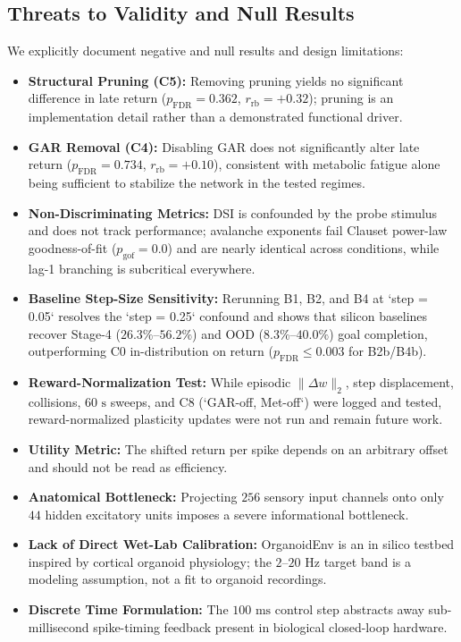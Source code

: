 \documentclass[journal]{IEEEtran}
\begin{document}
\subsection{Threats to Validity and Null Results}
We explicitly document negative and null results and design limitations:
\begin{itemize}
    \item \textbf{Structural Pruning (C5):} Removing pruning yields no significant difference in late return ($p_{\mathrm{FDR}} = 0.362$, $r_{\mathrm{rb}} = +0.32$); pruning is an implementation detail rather than a demonstrated functional driver.
    \item \textbf{GAR Removal (C4):} Disabling GAR does not significantly alter late return ($p_{\mathrm{FDR}} = 0.734$, $r_{\mathrm{rb}} = +0.10$), consistent with metabolic fatigue alone being sufficient to stabilize the network in the tested regimes.
    \item \textbf{Non-Discriminating Metrics:} DSI is confounded by the probe stimulus and does not track performance; avalanche exponents fail Clauset power-law goodness-of-fit ($p_{\mathrm{gof}} = 0.0$) and are nearly identical across conditions, while lag-1 branching is subcritical everywhere.
    \item \textbf{Baseline Step-Size Sensitivity:} Rerunning B1, B2, and B4 at `step = 0.05` resolves the `step = 0.25` confound and shows that silicon baselines recover Stage-4 ($26.3\%\text{--}56.2\%$) and OOD ($8.3\%\text{--}40.0\%$) goal completion, outperforming C0 in-distribution on return ($p_{\mathrm{FDR}} \le 0.003$ for B2b/B4b).
    \item \textbf{Reward-Normalization Test:} While episodic $\lVert \Delta w \rVert_2$, step displacement, collisions, $60\text{ s}$ sweeps, and C8 (`GAR-off, Met-off`) were logged and tested, reward-normalized plasticity updates were not run and remain future work.
    \item \textbf{Utility Metric:} The shifted return per spike depends on an arbitrary offset and should not be read as efficiency.
    \item \textbf{Anatomical Bottleneck:} Projecting $256$ sensory input channels onto only $44$ hidden excitatory units imposes a severe informational bottleneck.
    \item \textbf{Lack of Direct Wet-Lab Calibration:} OrganoidEnv is an in silico testbed inspired by cortical organoid physiology; the $2\text{--}20\text{ Hz}$ target band is a modeling assumption, not a fit to organoid recordings.
    \item \textbf{Discrete Time Formulation:} The $100\text{ ms}$ control step abstracts away sub-millisecond spike-timing feedback present in biological closed-loop hardware.
\end{itemize}
\end{document}
